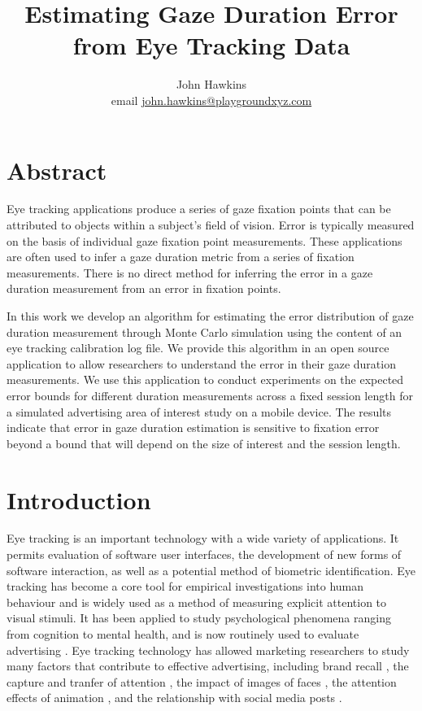 \documentclass[12pt,a4paper]{article}
\numberwithin{equation}{section}
\begin{document}
 
\title{Estimating Gaze Duration Error from Eye Tracking Data}

\author{
John Hawkins \\ email \href{mailto:john.hawkins@playgroundxyz.com}{john.hawkins@playgroundxyz.com} \\
} 

\maketitle

\section{Abstract}

Eye tracking applications produce a series of gaze fixation points that can be attributed to
objects within a subject's field of vision. Error is typically measured on the basis 
of individual gaze fixation point measurements. These applications are often used 
to infer a gaze duration metric from a series of fixation measurements. 
There is no direct method for inferring the error in
a gaze duration measurement from an error in fixation points. 

In this work we develop an algorithm for estimating the error distribution of 
gaze duration measurement through Monte Carlo simulation using the content 
of an eye tracking calibration log file. 
We provide this algorithm in an open source application
to allow researchers to understand the error in their gaze duration measurements. 
We use this application to conduct experiments on the expected error bounds for 
different duration measurements across a fixed session length for a simulated 
advertising area of interest study on a mobile device. 
The results indicate that error in gaze duration estimation is sensitive to
fixation error beyond a bound that will depend on the size of interest and the session length.


\section{Introduction}

Eye tracking is an important technology with a wide variety of applications. 
It permits evaluation of software user interfaces\cite{Harezlak2015}, 
the development of new forms of software interaction, as well as a potential method of biometric identification\cite{Kasprowski2018}. Eye tracking has become a core tool for empirical 
investigations into human behaviour and is widely used as a method of measuring explicit 
attention to visual stimuli. 
It has been applied to study psychological phenomena ranging from cognition\cite{Brunye2019}
to mental health\cite{Duque2014,Rudich-Strassler2022}, and is now routinely used to evaluate 
advertising \cite{Hervet2011}. Eye tracking technology has allowed marketing researchers 
to study many factors that contribute to effective advertising, 
including brand recall \cite{Wedel2000},
the capture and tranfer of attention \cite{Pieters2004}, 
the impact of images of faces \cite{Djamasbi2010},
the attention effects of animation \cite{Hamborg2012},
and the relationship with social media posts \cite{Barreto2013}.
\end{document}
